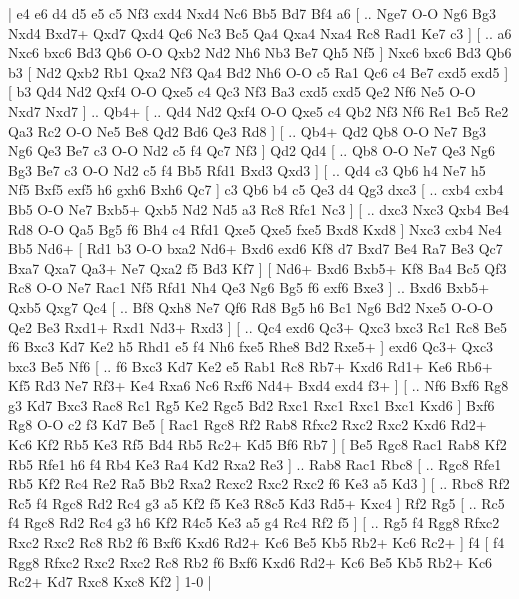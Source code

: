 \makegametitle 
|   e4   e6    d4   d5    e5   c5    Nf3   cxd4    Nxd4   Nc6    Bb5   Bd7    Bf4   a6 [ .. Nge7  O-O Ng6  Bg3 Nxd4  Bxd7+ Qxd7  Qxd4 Qc6  Nc3 Bc5  Qa4 Qxa4  Nxa4 Rc8  Rad1 Ke7  c3   ]  [ .. a6  Nxc6 bxc6  Bd3 Qb6  O-O Qxb2  Nd2 Nh6  Nb3 Be7  Qh5 Nf5   ]  Nxc6   bxc6    Bd3   Qb6    b3 [  Nd2 Qxb2  Rb1 Qxa2  Nf3 Qa4  Bd2 Nh6  O-O c5  Ra1 Qc6  c4 Be7  cxd5 exd5   ]  [  b3 Qd4  Nd2 Qxf4  O-O Qxe5  c4 Qc3  Nf3 Ba3  cxd5 cxd5  Qe2 Nf6  Ne5 O-O  Nxd7 Nxd7   ] .. Qb4+ [ .. Qd4  Nd2 Qxf4  O-O Qxe5  c4 Qb2  Nf3 Nf6  Re1 Bc5  Re2 Qa3  Rc2 O-O  Ne5 Be8  Qd2 Bd6  Qe3 Rd8   ]  [ .. Qb4+  Qd2 Qb8  O-O Ne7  Bg3 Ng6  Qe3 Be7  c3 O-O  Nd2 c5  f4 Qc7  Nf3   ]  Qd2   Qd4 [ .. Qb8  O-O Ne7  Qe3 Ng6  Bg3 Be7  c3 O-O  Nd2 c5  f4 Bb5  Rfd1 Bxd3  Qxd3   ]  [ .. Qd4  c3 Qb6  h4 Ne7  h5 Nf5  Bxf5 exf5  h6 gxh6  Bxh6 Qc7   ]  c3   Qb6    b4   c5    Qe3   d4    Qg3   dxc3 [ .. cxb4  cxb4 Bb5  O-O Ne7  Bxb5+ Qxb5  Nd2 Nd5  a3 Rc8  Rfc1 Nc3   ]  [ .. dxc3  Nxc3 Qxb4  Be4 Rd8  O-O Qa5  Bg5 f6  Bh4 c4  Rfd1 Qxe5  Qxe5 fxe5  Bxd8 Kxd8   ]  Nxc3   cxb4    Ne4   Bb5    Nd6+ [  Rd1 b3  O-O bxa2  Nd6+ Bxd6  exd6 Kf8  d7 Bxd7  Be4 Ra7  Be3 Qc7  Bxa7 Qxa7  Qa3+ Ne7  Qxa2 f5  Bd3 Kf7   ]  [  Nd6+ Bxd6  Bxb5+ Kf8  Ba4 Bc5  Qf3 Rc8  O-O Ne7  Rac1 Nf5  Rfd1 Nh4  Qe3 Ng6  Bg5 f6  exf6 Bxe3   ] .. Bxd6    Bxb5+   Qxb5    Qxg7   Qc4 [ .. Bf8  Qxh8 Ne7  Qf6 Rd8  Bg5 h6  Bc1 Ng6  Bd2 Nxe5  O-O-O Qe2  Be3 Rxd1+  Rxd1 Nd3+  Rxd3   ]  [ .. Qc4  exd6 Qc3+  Qxc3 bxc3  Rc1 Rc8  Be5 f6  Bxc3 Kd7  Ke2 h5  Rhd1 e5  f4 Nh6  fxe5 Rhe8  Bd2 Rxe5+   ]  exd6   Qc3+    Qxc3   bxc3    Be5   Nf6 [ .. f6  Bxc3 Kd7  Ke2 e5  Rab1 Rc8  Rb7+ Kxd6  Rd1+ Ke6  Rb6+ Kf5  Rd3 Ne7  Rf3+ Ke4  Rxa6 Nc6  Rxf6 Nd4+  Bxd4 exd4  f3+   ]  [ .. Nf6  Bxf6 Rg8  g3 Kd7  Bxc3 Rac8  Rc1 Rg5  Ke2 Rgc5  Bd2 Rxc1  Rxc1 Rxc1  Bxc1 Kxd6   ]  Bxf6   Rg8    O-O   c2    f3   Kd7    Be5 [  Rac1 Rgc8  Rf2 Rab8  Rfxc2 Rxc2  Rxc2 Kxd6  Rd2+ Kc6  Kf2 Rb5  Ke3 Rf5  Bd4 Rb5  Rc2+ Kd5  Bf6 Rb7   ]  [  Be5 Rgc8  Rac1 Rab8  Kf2 Rb5  Rfe1 h6  f4 Rb4  Ke3 Ra4  Kd2 Rxa2  Re3   ] .. Rab8    Rac1   Rbc8 [ .. Rgc8  Rfe1 Rb5  Kf2 Rc4  Re2 Ra5  Bb2 Rxa2  Rcxc2 Rxc2  Rxc2 f6  Ke3 a5  Kd3   ]  [ .. Rbc8  Rf2 Rc5  f4 Rgc8  Rd2 Rc4  g3 a5  Kf2 f5  Ke3 R8c5  Kd3 Rd5+  Kxc4   ]  Rf2   Rg5 [ .. Rc5  f4 Rgc8  Rd2 Rc4  g3 h6  Kf2 R4c5  Ke3 a5  g4 Rc4  Rf2 f5   ]  [ .. Rg5  f4 Rgg8  Rfxc2 Rxc2  Rxc2 Rc8  Rb2 f6  Bxf6 Kxd6  Rd2+ Kc6  Be5 Kb5  Rb2+ Kc6  Rc2+   ]  f4    [  f4 Rgg8  Rfxc2 Rxc2  Rxc2 Rc8  Rb2 f6  Bxf6 Kxd6  Rd2+ Kc6  Be5 Kb5  Rb2+ Kc6  Rc2+ Kd7  Rxc8 Kxc8  Kf2   ] 1-0  |
